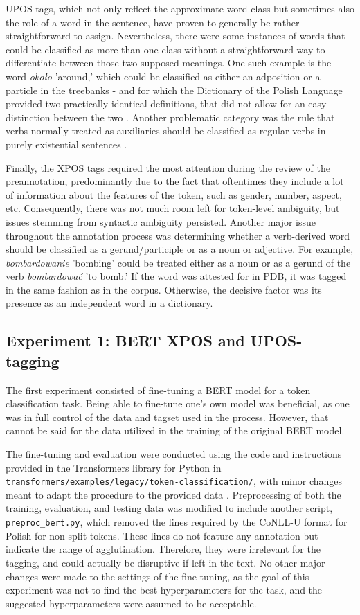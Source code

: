 UPOS tags, which not only reflect the approximate word class but sometimes also the role of a word in the sentence, have proven to generally be rather straightforward to assign. Nevertheless, there were some instances of words that could be classified as more than one class without a straightforward way to differentiate between those two supposed meanings. One such example is the word \textit{około} 'around,' which could be classified as either an adposition or a particle in the treebanks - and for which the Dictionary of the Polish Language provided two practically identical definitions, that did not allow for an easy distinction between the two \citep{okolopwn}. Another problematic category was the rule that verbs normally treated as auxiliaries should be classified as regular verbs in purely existential sentences \citep{polishud}. 

Finally, the XPOS tags required the most attention during the review of the preannotation, predominantly due to the fact that oftentimes they include a lot of information about the features of the token, such as gender, number, aspect, etc. Consequently, there was not much room left for token-level ambiguity, but issues stemming from syntactic ambiguity persisted. Another major issue throughout the annotation process was determining whether a verb-derived word should be classified as a gerund/participle or as a noun or adjective. For example, \textit{bombardowanie} 'bombing' could be treated either as a noun or as a gerund of the verb \textit{bombardować} 'to bomb.' If the word was attested for in PDB, it was tagged in the same fashion as in the corpus. Otherwise, the decisive factor was its presence as an independent word in a dictionary.  

\subsection{Experiment 1: BERT XPOS and UPOS-tagging}
\label{subsec:bert-tagging}

The first experiment consisted of fine-tuning a BERT model for a token classification task. Being able to fine-tune one's own model was beneficial, as one was in full control of the data and tagset used in the process. However, that cannot be said for the data utilized in the training of the original BERT model. 

The fine-tuning and evaluation were conducted using the code and instructions provided in the Transformers library for Python in \texttt{transformers/examples/legacy/token-classification/}, with minor changes meant to adapt the procedure to the provided data  \citep{wolf-etal-2020-transformers}. Preprocessing of both the training, evaluation, and testing data was modified to include another script, \texttt{preproc\_bert.py}, which removed the lines required by the CoNLL-U format for Polish for non-split tokens. These lines do not feature any annotation but indicate the range of agglutination. Therefore, they were irrelevant for the tagging, and could actually be disruptive if left in the text. No other major changes were made to the settings of the fine-tuning, as the goal of this experiment was not to find the best hyperparameters for the task, and the suggested hyperparameters were assumed to be acceptable.

